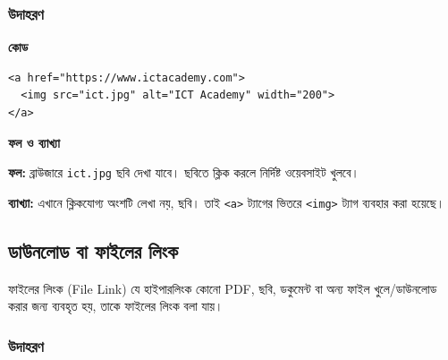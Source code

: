 \subsubsection{উদাহরণ}

\par\noindent
\begin{minipage}[t]{.54\linewidth}\vspace{0pt}\small
\textbf{\color{chFourTeal}কোড}\par
\begin{verbatim}
<a href="https://www.ictacademy.com">
  <img src="ict.jpg" alt="ICT Academy" width="200">
</a>
\end{verbatim}

\par\smallskip
\end{minipage}\hfill
\begin{minipage}[t]{.42\linewidth}\vspace{0pt}\small
\textbf{\color{chFourTeal}ফল ও ব্যাখ্যা}\par
\textbf{ফল:} ব্রাউজারে \texttt{ict.jpg} ছবি দেখা যাবে। ছবিতে ক্লিক করলে নির্দিষ্ট ওয়েবসাইট খুলবে।

\textbf{ব্যাখ্যা:} এখানে ক্লিকযোগ্য অংশটি লেখা নয়, ছবি। তাই \texttt{<a>} ট্যাগের ভিতরে \texttt{<img>} ট্যাগ ব্যবহার করা হয়েছে।
\par\smallskip
\end{minipage}\par




\subsection{ডাউনলোড বা ফাইলের লিংক}

\begin{definitionbox}{ফাইলের লিংক (File Link)}
যে হাইপারলিংক কোনো PDF, ছবি, ডকুমেন্ট বা অন্য ফাইল খুলে/ডাউনলোড করার জন্য ব্যবহৃত হয়, তাকে ফাইলের লিংক বলা যায়।
\end{definitionbox}

\subsubsection{উদাহরণ}

